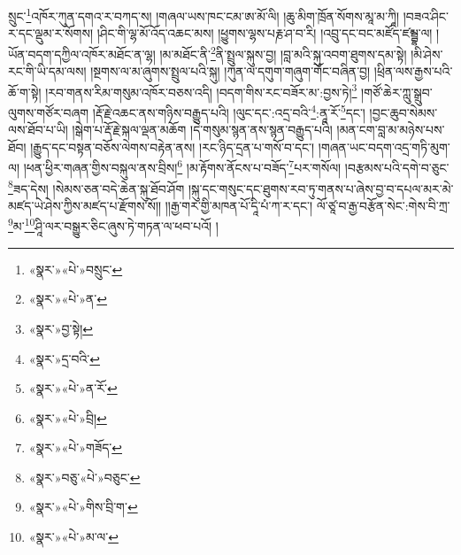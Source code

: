 སྲུང་\footnote{«སྣར་»«པེ་»བསྲུང་}འཁོར་ཀུན་དགའ་ར་བཀད་ས། །གཞལ་ཡས་ཁང་ངམ་ཨ་མོ་ལི། །ཆུ་མིག་ཁྲོན་སོགས་མཱ་མ་ཀཱི། །བཟའ་ཤིང་ར་དང་ལྡུམ་ར་སོགས། །ཤིང་གི་ལྷ་མོ་འོད་འཆང་མས། །ཕྱུགས་ལྷས་པརྞ་ཤ་བ་རི། །འབྲུ་དང་བང་མཛོད་ཛམྦྷ་ལ། །ཡོན་བདག་དཀྱིལ་འཁོར་མཐོང་ན་ལྷ། །མ་མཐོང་ནི་\footnote{«སྣར་»«པེ་»ན་}ནི་སྤྲུལ་སྐུས་བྱ། །བླ་མའི་སྐུ་འབག་ཐུགས་དམ་སྟེ། །མི་ཤེས་རང་གི་ཡི་དམ་ལས། །སྔགས་ལ་མ་ཞུགས་སྤྲུལ་པའི་སྐུ། །ཀུན་ལ་དགུག་གཞུག་གོང་བཞིན་བྱ། །ཕྲིན་ལས་རྒྱས་པའི་ཆོ་ག་སྟེ། །རབ་གནས་རིམ་གསུམ་འཁོར་བཅས་འདི། །བདག་གིས་རང་བཟོར་མ་:བྱས་ཏེ།\footnote{«སྣར་»བྱ་སྟེ།} །གཙོ་ཆེར་ཀླུ་སྒྲུབ་ལུགས་གཙོར་བཞག །རྡོ་རྗེ་འཆང་ནས་གཉིས་བརྒྱུད་པའི། །ལུང་དང་:འདྲ་བའི་\footnote{«སྣར་»དྲ་བའི་}:ནཱ་རོ་\footnote{«སྣར་»«པེ་»ན་རོ་}དང་། །བྱང་ཆུབ་སེམས་ལས་ཐོབ་པ་ཡི། །སྒེག་པ་རྡོ་རྗེ་སྐལ་ལྡན་མཆོག །དེ་གསུམ་སྙན་ནས་སྙན་བརྒྱུད་པའི། །མན་ངག་བླ་མ་མཉེས་པས་ཐོབ། །རྒྱུད་དང་བསྟན་བཅོས་ལེགས་བརྟེན་ནས། །རང་ཉིད་དྲན་པ་གསོ་བ་དང་། །གཞན་ཡང་བདག་འདྲ་གཏི་མུག་ལ། །ཕན་ཕྱིར་གཞན་གྱིས་བསྐུལ་ནས་བྲིས།\footnote{«སྣར་»«པེ་»བྲི།} །མ་རྟོགས་ནོངས་པ་བཟོད་\footnote{«སྣར་»«པེ་»གཟོད་}པར་གསོལ། །བརྩམས་པའི་དགེ་བ་ཅུང་\footnote{«སྣར་»བཅུ་«པེ་»བཅུང་}ཟད་དེས། །སེམས་ཅན་བདེ་ཆེན་སྐུ་ཐོབ་ཤོག །སྐུ་དང་གསུང་དང་ཐུགས་རབ་ཏུ་གནས་པ་ཞེས་བྱ་བ་དཔལ་མར་མེ་མཛད་ཡེ་ཤེས་ཀྱིས་མཛད་པ་རྫོགས་སོ།། །།རྒྱ་གར་གྱི་མཁན་པོ་དཱི་པཾ་ཀ་ར་དང་། ལོ་ཙཱ་བ་རྒྱ་བརྩོན་སེང་:གེས་བི་ཀྲ་\footnote{«སྣར་»«པེ་»གིས་བྲི་ག་}མ་\footnote{«སྣར་»«པེ་»མ་ལ་}ཤཱི་ལར་བསྒྱུར་ཅིང་ཞུས་ཏེ་གཏན་ལ་ཕབ་པའོ། ། 